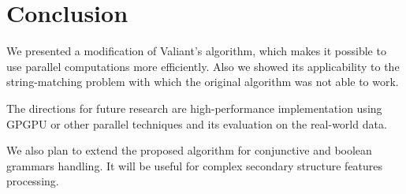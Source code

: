 \section{\bf Conclusion}

We presented a modification of Valiant's algorithm, which makes it possible to use parallel computations more efficiently. 
Also we showed its applicability to the string-matching problem with which the original algorithm was not able to work.

The directions for future research are high-performance implementation using GPGPU or other parallel techniques and its evaluation on the real-world data.

We also plan to extend the proposed algorithm for conjunctive and boolean grammars handling.
It will be useful for complex secondary structure features processing.